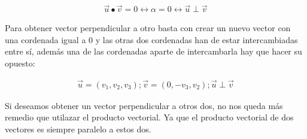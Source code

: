 \documentclass[
	12pt, %
	spanish, %
]{fphw}
\newcommand{\vu}{\vec{u}}
\newcommand{\vv}{\vec{v}}
\begin{document}
\begin{gather*}
	\vu \bullet \vv = 0 \leftrightarrow \alpha = 0 \leftrightarrow  \vu \perp \vv
\end{gather*}

Para obtener vector perpendicular a otro basta con crear un nuevo vector con una cordenada igual a 0 y las otras dos cordenadas han de estar intercambiadas entre sí, además una de las cordenadas aparte de intercambarla hay que hacer su opuesto:

\begin{gather*}
	\vu=(v_1,v_2,v_3); \vv=(0, -v_3,v_2); \vu \perp \vv
\end{gather*}

Si deseamos obtener un vector perpendicular a otros dos, no nos queda más remedio que utilazar el producto vectorial. Ya que el producto vectorial de dos vectores es siempre paralelo a estos dos.
\end{document}
